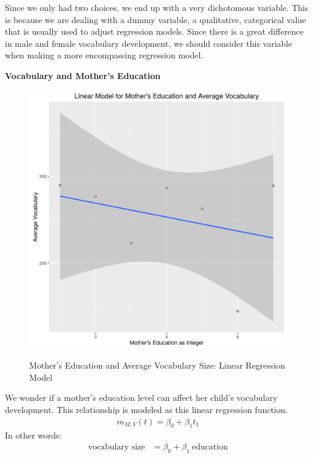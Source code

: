 \documentclass[11pt]{article}  %
\begin{document}
Since we only had two choices, we end up with a very dichotomous variable. This is because we are dealing with a dummy variable, a qualitative, categorical value that is usually used to adjust regression models. Since there is a great difference in male and female vocabulary development, we should consider this variable when making a more encompassing regression model.

\textbf{Vocabulary and Mother's Education}
\begin{figure}[h]
\centering
\caption{Mother's Education and Average Vocabulary Size: Linear Regression Model}
\includegraphics[scale=.50]{means_edu}
\label{momV}
\end{figure}

We wonder if a mother's education level can affect her child's vocabulary development. This relationship is modeled as this linear regression function.
    \begin{align*}
        m_{M;V}(t) = \beta_0 + \beta_1 t_1
    \end{align*}
    In other words:
    \begin{align*}
        \text{vocabulary size} &= \beta_0 + \beta_1\ \text{education}
    \end{align*}
\end{document}
